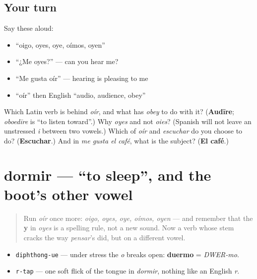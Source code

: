 \subsection*{Your turn}
Say these aloud:

\begin{itemize}
\raggedright
  \item \textquotedblleft{}oigo, oyes, oye, oímos, oyen\textquotedblright{}
  \item \textquotedblleft{}¿Me oyes?\textquotedblright{} — can you hear me?
  \item \textquotedblleft{}Me gusta oír\textquotedblright{} — hearing is pleasing to me
  \item \textquotedblleft{}oír\textquotedblright{} then English \textquotedblleft{}audio, audience, obey\textquotedblright{}
\end{itemize}

\begin{tcolorbox}[breakable,colback=teal!4,colframe=teal!35!black,title={Before you move on}]
Which Latin verb is behind \emph{oír}, and what has \emph{obey} to do with it? (\textbf{Audīre}; \emph{oboedīre} is \textquotedblleft{}to listen toward\textquotedblright{}.) Why \emph{oyes} and not \emph{oies}? (Spanish will not leave an unstressed \emph{i} between two vowels.) Which of \emph{oír} and \emph{escuchar} do you choose to do? (\textbf{Escuchar}.) And in \emph{me gusta el café}, what is the subject? (\textbf{El café}.)
\end{tcolorbox}
\section[dormir]{dormir — \textquotedblleft{}to sleep\textquotedblright{}, and the boot's other vowel}

\label{lesson:ES-C36-dormir}



\begin{quote}
Run \emph{oír} once more: \emph{oigo, oyes, oye, oímos, oyen} — and remember that the \textbf{y} in \emph{oyes} is a spelling rule, not a new sound. Now a verb whose stem cracks the way \emph{pensar}'s did, but on a different vowel.
\end{quote}

\begin{sounds}
\begin{itemize}
\raggedright
  \item \texttt{diphthong-ue} — under stress the \emph{o} breaks open: \textbf{duermo} = \emph{DWER-mo}.
  \item \texttt{r-tap} — one soft flick of the tongue in \emph{dormir}, nothing like an English \emph{r}.
\end{itemize}
\end{sounds}

